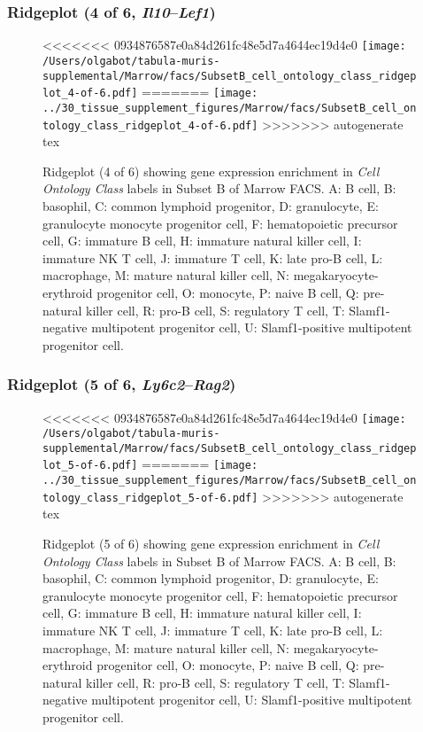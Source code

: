 \clearpage

\subsubsection{Ridgeplot (4 of 6, \emph{Il10}--\emph{Lef1})}
\begin{figure}[h]
\centering
<<<<<<< 0934876587e0a84d261fc48e5d7a4644ec19d4e0
\texttt{[image: /Users/olgabot/tabula-muris-supplemental/Marrow/facs/SubsetB\_cell\_ontology\_class\_ridgeplot\_4-of-6.pdf]}
=======
\texttt{[image: ../30\_tissue\_supplement\_figures/Marrow/facs/SubsetB\_cell\_ontology\_class\_ridgeplot\_4-of-6.pdf]}
>>>>>>> autogenerate tex

\caption{ Ridgeplot (4 of 6)  showing gene expression enrichment in \emph{Cell Ontology Class} labels in Subset B of Marrow FACS. A: B cell, B: basophil, C: common lymphoid progenitor, D: granulocyte, E: granulocyte monocyte progenitor cell, F: hematopoietic precursor cell, G: immature B cell, H: immature natural killer cell, I: immature NK T cell, J: immature T cell, K: late pro-B cell, L: macrophage, M: mature natural killer cell, N: megakaryocyte-erythroid progenitor cell, O: monocyte, P: naive B cell, Q: pre-natural killer cell, R: pro-B cell, S: regulatory T cell, T: Slamf1-negative multipotent progenitor cell, U: Slamf1-positive multipotent progenitor cell.}
\end{figure}


\clearpage

\subsubsection{Ridgeplot (5 of 6, \emph{Ly6c2}--\emph{Rag2})}
\begin{figure}[h]
\centering
<<<<<<< 0934876587e0a84d261fc48e5d7a4644ec19d4e0
\texttt{[image: /Users/olgabot/tabula-muris-supplemental/Marrow/facs/SubsetB\_cell\_ontology\_class\_ridgeplot\_5-of-6.pdf]}
=======
\texttt{[image: ../30\_tissue\_supplement\_figures/Marrow/facs/SubsetB\_cell\_ontology\_class\_ridgeplot\_5-of-6.pdf]}
>>>>>>> autogenerate tex

\caption{ Ridgeplot (5 of 6)  showing gene expression enrichment in \emph{Cell Ontology Class} labels in Subset B of Marrow FACS. A: B cell, B: basophil, C: common lymphoid progenitor, D: granulocyte, E: granulocyte monocyte progenitor cell, F: hematopoietic precursor cell, G: immature B cell, H: immature natural killer cell, I: immature NK T cell, J: immature T cell, K: late pro-B cell, L: macrophage, M: mature natural killer cell, N: megakaryocyte-erythroid progenitor cell, O: monocyte, P: naive B cell, Q: pre-natural killer cell, R: pro-B cell, S: regulatory T cell, T: Slamf1-negative multipotent progenitor cell, U: Slamf1-positive multipotent progenitor cell.}
\end{figure}


